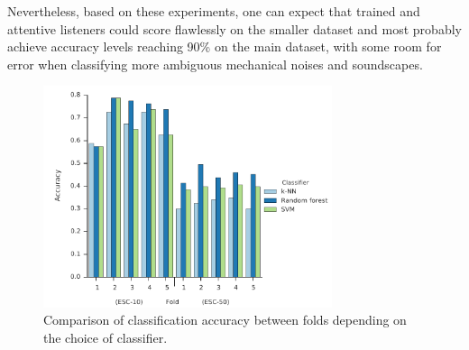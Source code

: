 \documentclass[letterpaper]{sig-alternate}
\begin{document}
Nevertheless, based on these experiments, one can expect that trained and attentive listeners could score flawlessly on the smaller dataset and most probably achieve accuracy levels reaching 90\% on the main dataset, with some room for error when classifying more ambiguous mechanical noises and soundscapes.

\renewcommand{\topfraction}{0.8}
\renewcommand{\floatpagefraction}{0.8}

\begin{figure}
\centering
\includegraphics[width=20pc]{Figures/figure_accuracy_folds.pdf}
\caption{\label{fig:accuracy}Comparison of classification accuracy between folds depending on the choice of classifier.}
\vspace{-12pt}
\end{figure}
\end{document}

